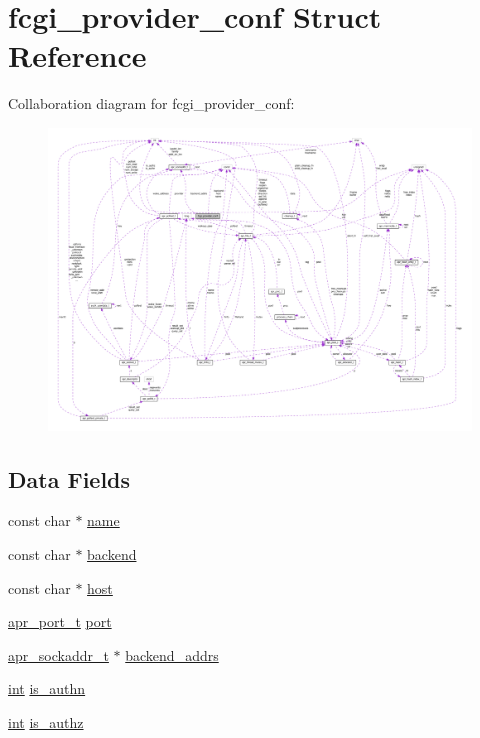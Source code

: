 \hypertarget{structfcgi__provider__conf}{}\section{fcgi\+\_\+provider\+\_\+conf Struct Reference}
\label{structfcgi__provider__conf}


Collaboration diagram for fcgi\+\_\+provider\+\_\+conf\+:
\nopagebreak
\begin{figure}[H]
\begin{center}
\leavevmode
\includegraphics[width=350pt]{structfcgi__provider__conf__coll__graph}
\end{center}
\end{figure}
\subsection*{Data Fields}
\begin{DoxyCompactItemize}
\item 
const char $\ast$ \hyperlink{structfcgi__provider__conf_af601d1fe91b391de481e9ac4e69a9b12}{name}
\item 
const char $\ast$ \hyperlink{structfcgi__provider__conf_a63fce1860deffbce23c7fe5c61441501}{backend}
\item 
const char $\ast$ \hyperlink{structfcgi__provider__conf_a5877fc317b4bb97197df18cb9aedbc25}{host}
\item 
\hyperlink{group__apr__network__io_gaa670a71960f6eb4fe0d0de2a1e7aba03}{apr\+\_\+port\+\_\+t} \hyperlink{structfcgi__provider__conf_a71d8f719744b0cff83bf0e08bd41c816}{port}
\item 
\hyperlink{structapr__sockaddr__t}{apr\+\_\+sockaddr\+\_\+t} $\ast$ \hyperlink{structfcgi__provider__conf_a91574f74db29031666f3f0e8eb7fe461}{backend\+\_\+addrs}
\item 
\hyperlink{pcre_8txt_a42dfa4ff673c82d8efe7144098fbc198}{int} \hyperlink{structfcgi__provider__conf_a18e76cc4275fd8876ceff08b1bd37b3c}{is\+\_\+authn}
\item 
\hyperlink{pcre_8txt_a42dfa4ff673c82d8efe7144098fbc198}{int} \hyperlink{structfcgi__provider__conf_a03bfd192eda026a50c3673ce8d43a2c2}{is\+\_\+authz}
\end{DoxyCompactItemize}


